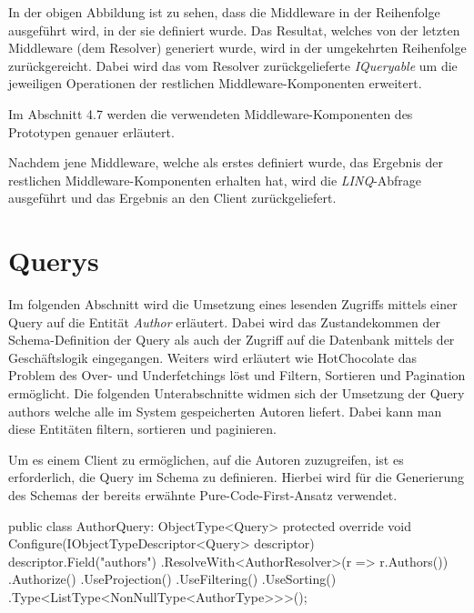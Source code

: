 In der obigen Abbildung ist zu sehen, dass die Middleware in der Reihenfolge ausgeführt wird, in der sie definiert wurde.
Das Resultat, welches von der letzten Middleware (dem Resolver) generiert wurde, wird in der umgekehrten Reihenfolge zurückgereicht.
Dabei wird das vom Resolver zurückgelieferte \textit{IQueryable} um die jeweiligen Operationen der restlichen Middleware-Komponenten erweitert.
\newline

Im Abschnitt 4.7 werden die verwendeten Middleware-Komponenten des Prototypen genauer erläutert.

Nachdem jene Middleware, welche als erstes definiert wurde, das Ergebnis der restlichen Middleware-Komponenten erhalten hat, wird die \textit{LINQ}-Abfrage ausgeführt und das Ergebnis an den Client zurückgeliefert.

\section{Querys}
Im folgenden Abschnitt wird die Umsetzung eines lesenden Zugriffs mittels einer Query auf die Entität \textit{Author} erläutert.
Dabei wird das Zustandekommen der Schema-Definition der Query als auch der Zugriff auf die Datenbank mittels der Geschäftslogik eingegangen.
Weiters wird erläutert wie HotChocolate das Problem des Over- und Underfetchings löst und Filtern, Sortieren und Pagination ermöglicht.
\newline
Die folgenden Unterabschnitte widmen sich der Umsetzung der Query authors welche alle im System gespeicherten Autoren liefert.
Dabei kann man diese Entitäten filtern, sortieren und paginieren. %

Um es einem Client zu ermöglichen, auf die Autoren zuzugreifen, ist es erforderlich, die Query im Schema zu definieren.
Hierbei wird für die Generierung des Schemas der bereits erwähnte Pure-Code-First-Ansatz verwendet.
\newline

\begin{JsCode}
public class AuthorQuery: ObjectType<Query> {
  protected override void Configure(IObjectTypeDescriptor<Query> descriptor){
    descriptor.Field("authors")
        .ResolveWith<AuthorResolver>(r => r.Authors())
        .Authorize()
        .UseProjection()
        .UseFiltering()
        .UseSorting()
        .Type<ListType<NonNullType<AuthorType>>>();
   }
}
\end{JsCode}

